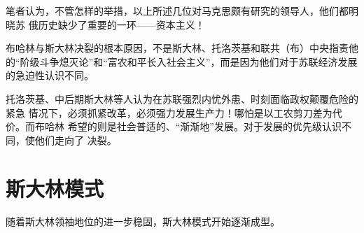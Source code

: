笔者认为，不管怎样的举措，以上所述几位对马克思颇有研究的领导人，他们都明晓苏
俄历史缺少了重要的一环——资本主义！

布哈林与斯大林决裂的根本原因，不是斯大林、托洛茨基和联共（布）中央指责他
的“阶级斗争熄灭论”和“富农和平长入社会主义”，而是因为他们对于苏联经济发展
的急迫性认识不同。

托洛茨基、中后期斯大林等人认为在苏联强烈内忧外患、时刻面临政权颠覆危险的紧急
情况下，必须抓紧改革，必须强力发展生产力！哪怕是以工农剪刀差为代价。而布哈林
希望的则是社会普适的、“渐渐地”发展。对于发展的优先级认识不同，使他们走向了
决裂。

\section{斯大林模式}

随着斯大林领袖地位的进一步稳固，斯大林模式开始逐渐成型。

